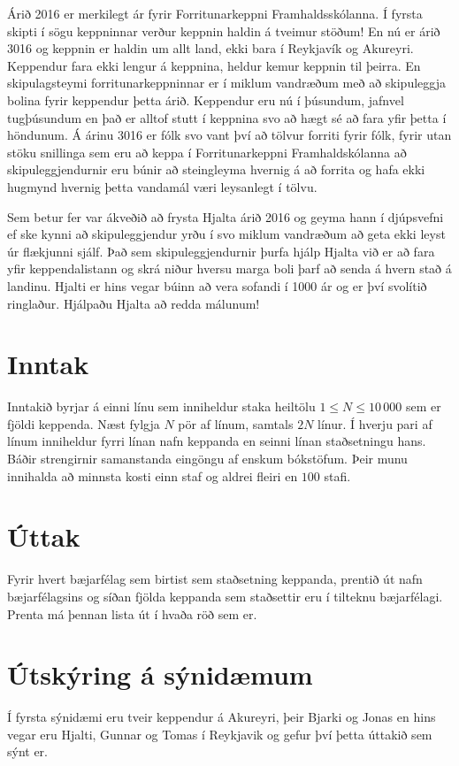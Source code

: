 Árið 2016 er merkilegt ár fyrir Forritunarkeppni Framhaldsskólanna. Í fyrsta
skipti í sögu keppninnar verður keppnin haldin á tveimur stöðum! En nú er árið
3016 og keppnin er haldin um allt land, ekki bara í Reykjavík og Akureyri.
Keppendur fara ekki lengur á keppnina, heldur kemur keppnin til þeirra.  En
skipulagsteymi forritunarkeppninnar er í miklum vandræðum með að skipuleggja
bolina fyrir keppendur þetta árið. Keppendur eru nú í þúsundum, jafnvel
tugþúsundum en það er alltof stutt í keppnina svo að hægt sé að fara yfir
þetta í höndunum. Á árinu 3016 er fólk svo vant því að tölvur forriti fyrir
fólk, fyrir utan stöku snillinga sem eru að keppa í Forritunarkeppni
Framhaldskólanna að skipuleggjendurnir eru búnir að steingleyma hvernig á að
forrita og hafa ekki hugmynd hvernig þetta vandamál væri leysanlegt í tölvu.

Sem betur fer var ákveðið að frysta Hjalta árið 2016 og geyma hann í djúpsvefni
ef ske kynni að skipuleggjendur yrðu í svo miklum vandræðum að geta ekki leyst
úr flækjunni sjálf. Það sem skipuleggjendurnir þurfa hjálp Hjalta við er að fara
yfir keppendalistann og skrá niður hversu marga boli þarf að senda á hvern stað
á landinu. Hjalti er hins vegar búinn að vera sofandi í 1000 ár og er því
svolítið ringlaður. Hjálpaðu Hjalta að redda málunum!

\section*{Inntak}
Inntakið byrjar á einni línu sem inniheldur staka heiltölu $1\leq N\leq
10\,000$ sem er fjöldi keppenda. Næst fylgja $N$ pör af línum, samtals $2N$
línur. Í hverju pari af línum inniheldur fyrri línan nafn keppanda en seinni
línan staðsetningu hans. Báðir strengirnir samanstanda eingöngu af enskum
bókstöfum. Þeir munu innihalda að minnsta kosti einn staf og aldrei fleiri en
$100$ stafi.

\section*{Úttak}
Fyrir hvert bæjarfélag sem birtist sem staðsetning keppanda, prentið út nafn
bæjarfélagsins og síðan fjölda keppanda sem staðsettir eru í tilteknu
bæjarfélagi. Prenta má þennan lista út í hvaða röð sem er.

\section*{Útskýring á sýnidæmum}
Í fyrsta sýnidæmi eru tveir keppendur á Akureyri, þeir Bjarki og Jonas en hins
vegar eru Hjalti, Gunnar og Tomas í Reykjavik og gefur því þetta úttakið sem
sýnt er.

